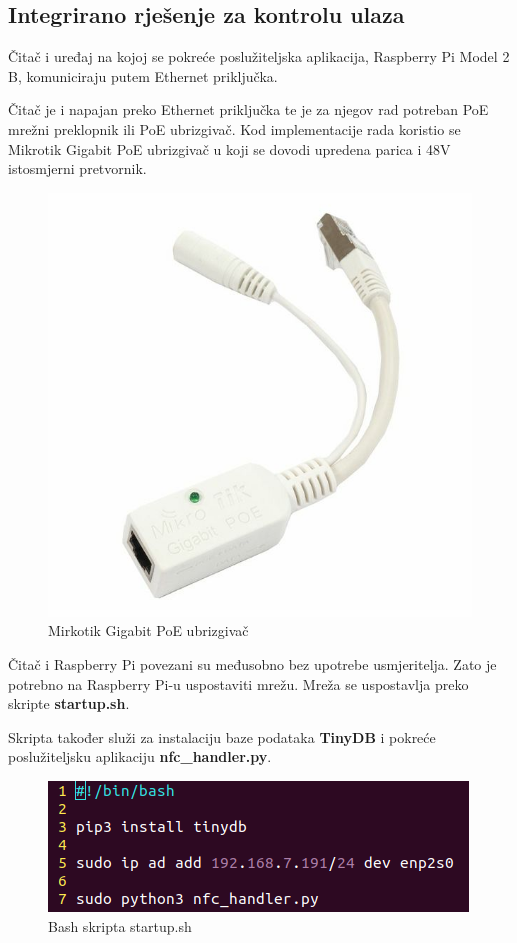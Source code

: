 \documentclass[times, utf8, zavrsni]{fer}
\begin{document}
\newpage

\subsection{Integrirano rješenje za kontrolu ulaza}
Čitač i uređaj na kojoj se pokreće poslužiteljska aplikacija, Raspberry Pi Model 2 B, komuniciraju putem Ethernet priključka. \par 
Čitač je i napajan preko Ethernet priključka te je za njegov rad potreban PoE mrežni preklopnik ili PoE ubrizgivač. Kod implementacije rada koristio se Mikrotik Gigabit PoE ubrizgivač u koji se dovodi upredena parica i 48V istosmjerni pretvornik. 

\begin{figure}[h]
\includegraphics[scale=0.3]{poe.jpg}
\centering
\caption{Mirkotik Gigabit PoE ubrizgivač \citep{14}}
\centering
\end{figure}

Čitač i Raspberry Pi povezani su međusobno bez upotrebe usmjeritelja. Zato je potrebno na Raspberry Pi-u uspostaviti mrežu. Mreža se uspostavlja preko skripte \textbf{startup.sh}.\par 
Skripta također služi za instalaciju baze podataka \textbf{TinyDB} i pokreće poslužiteljsku aplikaciju \textbf{nfc\_handler.py}.

\begin{figure}[h]
\includegraphics[scale=0.6]{skripta.png}
\centering
\caption{Bash skripta startup.sh}
\centering
\end{figure}
\end{document}
